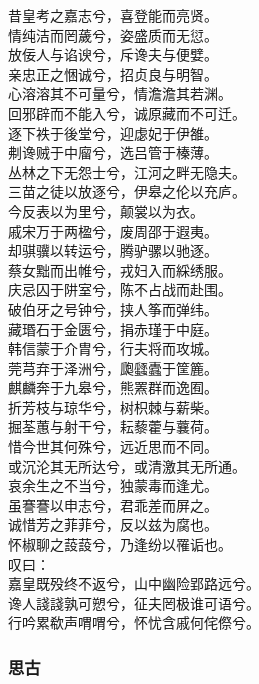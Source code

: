 \documentclass[]{article}
\begin{document}
昔皇考之嘉志兮，喜登能而亮贤。\\
情纯洁而罔薉兮，姿盛质而无愆。\\
放佞人与谄谀兮，斥谗夫与便嬖。\\
亲忠正之悃诚兮，招贞良与明智。\\
心溶溶其不可量兮，情澹澹其若渊。\\
回邪辟而不能入兮，诚原藏而不可迁。\\
逐下袟于後堂兮，迎虙妃于伊雒。\\
刜谗贼于中廇兮，选吕管于榛薄。\\
丛林之下无怨士兮，江河之畔无隐夫。\\
三苗之徒以放逐兮，伊皋之伦以充庐。\\
今反表以为里兮，颠裳以为衣。\\
戚宋万于两楹兮，废周邵于遐夷。\\
却骐骥以转运兮，腾驴骡以驰逐。\\
蔡女黜而出帷兮，戎妇入而綵绣服。\\
庆忌囚于阱室兮，陈不占战而赴围。\\
破伯牙之号钟兮，挟人筝而弹纬。\\
藏瑉石于金匮兮，捐赤瑾于中庭。\\
韩信蒙于介胄兮，行夫将而攻城。\\
莞芎弃于泽洲兮，瓟瓥蠹于筐簏。\\
麒麟奔于九皋兮，熊罴群而逸囿。\\
折芳枝与琼华兮，树枳棘与薪柴。\\
掘荃蕙与射干兮，耘藜藿与蘘荷。\\
惜今世其何殊兮，远近思而不同。\\
或沉沦其无所达兮，或清激其无所通。\\
哀余生之不当兮，独蒙毒而逢尤。\\
虽謇謇以申志兮，君乖差而屏之。\\
诚惜芳之菲菲兮，反以兹为腐也。\\
怀椒聊之蔎蔎兮，乃逢纷以罹诟也。\\
叹曰：\\
嘉皇既殁终不返兮，山中幽险郢路远兮。\\
谗人諓諓孰可愬兮，征夫罔极谁可语兮。\\
行吟累欷声喟喟兮，怀忧含戚何侘傺兮。

\hypertarget{header-n356}{%
\subsubsection{思古}\label{header-n356}}
\end{document}
